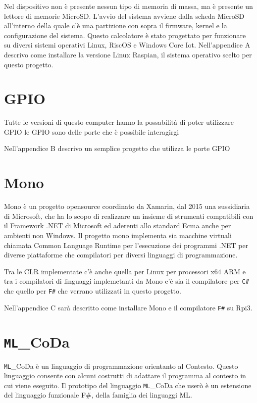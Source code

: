Nel dispositivo non è presente nessun tipo di memoria di massa, ma è presente un lettore di memorie MicroSD.
L'avvio del sistema avviene dalla scheda MicroSD all'interno della quale c'è una partizione con sopra il firmware, kernel e la configurazione del sistema.
Questo calcolatore è stato progettato per funzionare su diversi sistemi operativi Linux, RiscOS e Windows Core Iot.
Nell'appendice A descrivo come installare la versione Linux Raspian, il sistema operativo scelto per questo progetto.

\section{GPIO}
Tutte le versioni di questo computer hanno la possabilità di poter utilizzare GPIO  le GPIO sono delle porte che è possibile interagirgi

Nell'appendice B descrivo un semplice progetto che utilizza le porte GPIO


 

\section{Mono}
Mono è un progetto opensource coordinato da Xamarin, dal 2015 una sussidiaria di Microsoft, che ha lo scopo di realizzare  un insieme di strumenti compatibili con il Framework .NET di Microsoft ed aderenti allo standard Ecma anche per ambienti non Windows.
Il progetto mono implementa sia macchine virtuali chiamata Common Language Runtime per l'esecuzione dei programmi .NET per diverse piattaforme che compilatori per diversi linguaggi di programmazione.

Tra le CLR implementate c'è anche quella per Linux per processori x64 ARM e tra i compilatori di linguaggi implemetanti da Mono c'è sia il compilatore per \texttt{C\#} che quello per \texttt{F\#} che verrano utilizzati in questo progetto.

Nell'appendice C sarà  descritto come installare Mono e il compilatore \texttt{F\#} su Rpi3.


\section{\texttt{ML}_{CoDa}}
 \texttt{ML}_{CoDa} è un linguaggio di programmazione orientanto al Contesto. Questo linguaggio consente con alcuni costrutti di adattare il programma al contesto in cui viene eseguito. Il prototipo del linguaggio \texttt{ML}_{CoDa} che userò è un estensione del linguaggio funzionale F#, della famiglia dei linguaggi ML.
 
